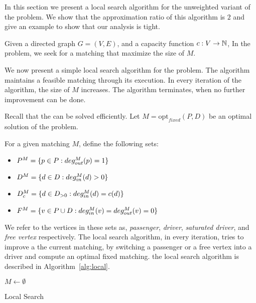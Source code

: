 \label{sub:uwcm}
In this section we present a local search algorithm for the unweighted
variant of the problem.
We show that the approximation ratio of this algorithm is $2$ and give an example
to show that our analysis is tight.

Given a directed graph $G = (V, E)$, 
and a capacity function ${c : V \rightarrow \mathbb{N}}$, 
In the \textsc{\UWCARPOOL{}} problem, 
we seek for a matching that maximize the size of $M$.

We now present a simple local search algorithm for the problem. 
The algorithm maintains a feasible matching through its execution.
In every iteration of the algorithm, the size of $M$ increases.
The algorithm terminates, when no further improvement can be done. 

Recall that the \FIXEDCARPOOL{} can be solved efficiently.
Let $M = \text{opt}_{fixed}(P, D)$ be an optimal solution of the
\FIXEDCARPOOL{} problem.
%

For a given matching $M$, define the following sets:
\begin{itemize}
\item $P^M = \{p \in P : deg^M_{out}(p) = 1\}$
\item $D^M = \{d \in D : deg^M_{in}(d) > 0\}$
\item $D^M_c = \{d \in D_{>0} : deg^M_{in}(d) = c(d)\}$
\item $F^M = \{v \in P \cup D : deg^M_{in}(v) = deg^M_{out}(v) = 0\}$ 
\end{itemize}
We refer to the vertices in these sets as, \emph{passenger}, 
\emph{driver}, \emph{saturated driver}, and \emph{free vertex} respectively.
The local search algorithm, in every iteration, 
tries to improve a the current matching, 
by switching a passenger or a free vertex into a driver 
and compute an optimal fixed matching.
the local search algorithm is described in
Algorithm~\ref{alg:local}.

\begin{algorithm}
$M \leftarrow \emptyset$					\\

\caption{
\label{alg:local}
Local Search}
\end{algorithm}

